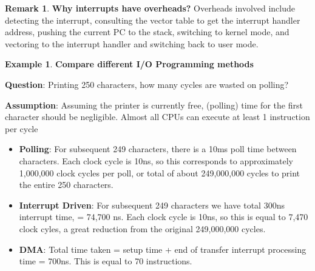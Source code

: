\documentclass[11pt,a4paper]{article}
\theoremstyle{definition}
\newtheorem*{remark}{Remark}
\newtheorem{example}{Example}[section]
\newenvironment{myitemize}
{ \begin{itemize}
    \setlength{\itemsep}{5pt}
    \setlength{\parskip}{0pt}
    \setlength{\parsep}{0pt}     }
{ \end{itemize}                  }
\begin{document}
\begin{remark}{\textbf{Why interrupts have overheads?}}
	Overheads involved include detecting the interrupt, consulting the vector table to get the interrupt handler address, pushing the current PC to the stack, switching to kernel mode, and vectoring to the interrupt handler and switching back to user mode.
\end{remark}

\begin{example}{\textbf{Compare different I/O Programming methods}}

	\textbf{Question}: Printing 250 characters, how many cycles are wasted on polling?
	
	\textbf{Assumption}: Assuming the printer is currently free, (polling) time for the first character should be negligible. Almost all CPUs can execute at least 1 instruction per cycle
	
	\begin{myitemize}
		\item \textbf{Polling}: For subsequent 249 characters, there is a 10ms poll time between characters. Each clock cycle is 10ns, so this corresponds to approximately 1,000,000 clock cycles per poll, or total of about 249,000,000 cycles to print the entire 250 characters.
		\item \textbf{Interrupt Driven}: For subsequent 249 characters we have total 300ns interrupt time, = 74,700 ns. Each clock cycle is 10ns, so this is equal to 7,470 clock cyles, a great reduction from the original 249,000,000 cycles.
		\item \textbf{DMA}: Total time taken = setup time + end of transfer interrupt processing time = 700ns. This is equal to 70 instructions.
	\end{myitemize}
\end{example}
\end{document}
